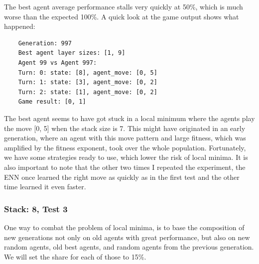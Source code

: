 \documentclass[11pt]{report}
\begin{document}
\begin{enumerate}
\begin{center}
    \end{center}
    The best agent average performance stalls very quickly at 50\%, which is much worse than the expected 100\%.
    A quick look at the game output shows what happened:
    \begin{verbatim}
    Generation: 997
    Best agent layer sizes: [1, 9]
    Agent 99 vs Agent 997:
    Turn: 0: state: [8], agent_move: [0, 5]
    Turn: 1: state: [3], agent_move: [0, 2]
    Turn: 2: state: [1], agent_move: [0, 2]
    Game result: [0, 1]
    \end{verbatim}
    The best agent seems to have got stuck in a local minimum where the agents play the move [0, 5] when the stack size is 7.
    This might have originated in an early generation, where an agent with this move pattern and large fitness, which was amplified by the fitness exponent, took over the whole population.
    Fortunately, we have some strategies ready to use, which lower the risk of local minima.
    It is also important to note that the other two times I repeated the experiment, the ENN once learned the right move as quickly as in the first test and the other time learned it even faster.
                \subsubsection{Stack: 8, Test 3}
    One way to combat the problem of local minima, is to base the composition of new generations not only on old agents with great performance, but also on new random agents, old best agents, and random agents from the previous generation.
    We will set the share for each of those to 15\%.
    \\
    \renewcommand{\csvpath}{../data/simple_nim/stack_8/t_3/stats.csv} %
    \begin{center}
\end{center}
\end{enumerate}
\end{document}
